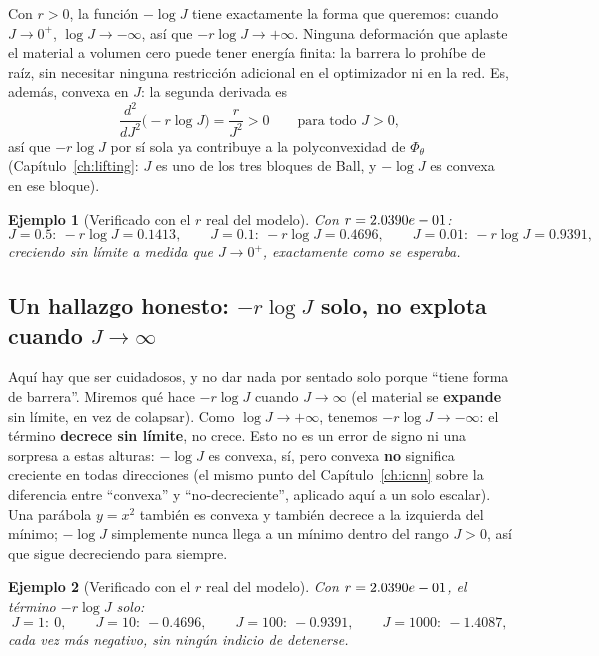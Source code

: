\documentclass[11pt,a4paper]{article}
\newtheorem{ejemplo}{Ejemplo}
\begin{document}
Con $r>0$, la funci\'on $-\log J$ tiene exactamente la forma que
queremos: cuando $J\to0^+$, $\log J\to-\infty$, as\'i que
$-r\log J\to+\infty$. Ninguna deformaci\'on que aplaste el material a
volumen cero puede tener energ\'ia finita: la barrera lo proh\'ibe de
ra\'iz, sin necesitar ninguna restricci\'on adicional en el
optimizador ni en la red. Es, adem\'as, convexa en $J$: la segunda
derivada es
\[
 \frac{d^2}{dJ^2}\big(-r\log J\big)=\frac{r}{J^2}>0
 \qquad\text{para todo }J>0,
\]
as\'i que $-r\log J$ por s\'i sola ya contribuye a la polyconvexidad
de $\Phi_\theta$ (Cap\'itulo~\ref{ch:lifting}: $J$ es uno de los tres
bloques de Ball, y $-\log J$ es convexa en ese bloque).

\begin{ejemplo}[Verificado con el $r$ real del modelo]
\label{ex:appB-volumetric-collapse}
Con $r=2.0390e-01{}$:
\[
 J=0.5:\ -r\log J=0.1413,\qquad
 J=0.1:\ -r\log J=0.4696,\qquad
 J=0.01:\ -r\log J=0.9391,
\]
creciendo sin l\'imite a medida que $J\to0^+$, exactamente como se
esperaba.
\end{ejemplo}

\subsection{Un hallazgo honesto: $-r\log J$ solo, \textbf{no} explota cuando $J\to\infty$}

Aqu\'i hay que ser cuidadosos, y no dar nada por sentado solo porque
``tiene forma de barrera''. Miremos qu\'e hace $-r\log J$ cuando
$J\to\infty$ (el material se \textbf{expande} sin l\'imite, en vez de
colapsar). Como $\log J\to+\infty$, tenemos
$-r\log J\to-\infty$: el t\'ermino \textbf{decrece sin l\'imite}, no
crece. Esto no es un error de signo ni una sorpresa a estas alturas:
$-\log J$ es convexa, s\'i, pero convexa \textbf{no} significa
creciente en todas direcciones (el mismo punto del
Cap\'itulo~\ref{ch:icnn} sobre la diferencia entre ``convexa'' y
``no-decreciente'', aplicado aqu\'i a un solo escalar). Una par\'abola
$y=x^2$ tambi\'en es convexa y tambi\'en decrece a la izquierda del
m\'inimo; $-\log J$ simplemente nunca llega a un m\'inimo dentro del
rango $J>0$, as\'i que sigue decreciendo para siempre.

\begin{ejemplo}[Verificado con el $r$ real del modelo]
\label{ex:appB-volumetric-decreasing}
Con $r=2.0390e-01{}$, el t\'ermino $-r\log J$ solo:
\[
 J=1:\ 0,\qquad J=10:\ -0.4696,\qquad J=100:\ -0.9391,\qquad
 J=1000:\ -1.4087,
\]
cada vez m\'as negativo, sin ning\'un indicio de detenerse.
\end{ejemplo}
\end{document}
